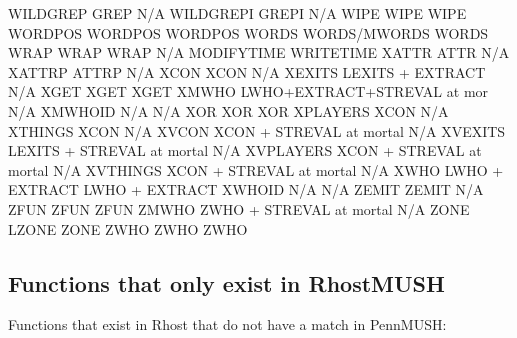 \documentclass[letterpaper,10pt,english]{sphinxmanual}
\begin{document}
\begin{sphinxVerbatim}[commandchars=\\\{\}]
WILDGREP                GREP                         N/A
WILDGREPI               GREPI                        N/A
WIPE                    WIPE                         WIPE
WORDPOS                 WORDPOS                      WORDPOS
WORDS                   WORDS/MWORDS                 WORDS
WRAP                    WRAP                         WRAP
N/A                     MODIFYTIME                   WRITETIME
XATTR                   ATTR                         N/A
XATTRP                  ATTRP                        N/A
XCON                    XCON                         N/A
XEXITS                  LEXITS + EXTRACT             N/A
XGET                    XGET                         XGET
XMWHO                   LWHO+EXTRACT+STREVAL at mor  N/A
XMWHOID                 N/A                          N/A
XOR                     XOR                          XOR
XPLAYERS                XCON                         N/A
XTHINGS                 XCON                         N/A
XVCON                   XCON + STREVAL at mortal     N/A
XVEXITS                 LEXITS + STREVAL at mortal   N/A
XVPLAYERS               XCON + STREVAL at mortal     N/A
XVTHINGS                XCON + STREVAL at mortal     N/A
XWHO                    LWHO + EXTRACT               LWHO + EXTRACT
XWHOID                  N/A                          N/A
ZEMIT                   ZEMIT                        N/A
ZFUN                    ZFUN                         ZFUN
ZMWHO                   ZWHO + STREVAL at mortal     N/A
ZONE                    LZONE                        ZONE
ZWHO                    ZWHO                         ZWHO
\end{sphinxVerbatim}


\subsection{Functions that only exist in RhostMUSH}
\label{\detokenize{differences:functions-that-only-exist-in-rhostmush}}
\sphinxAtStartPar
Functions that exist in Rhost that do not have a match in PennMUSH:
\end{document}
